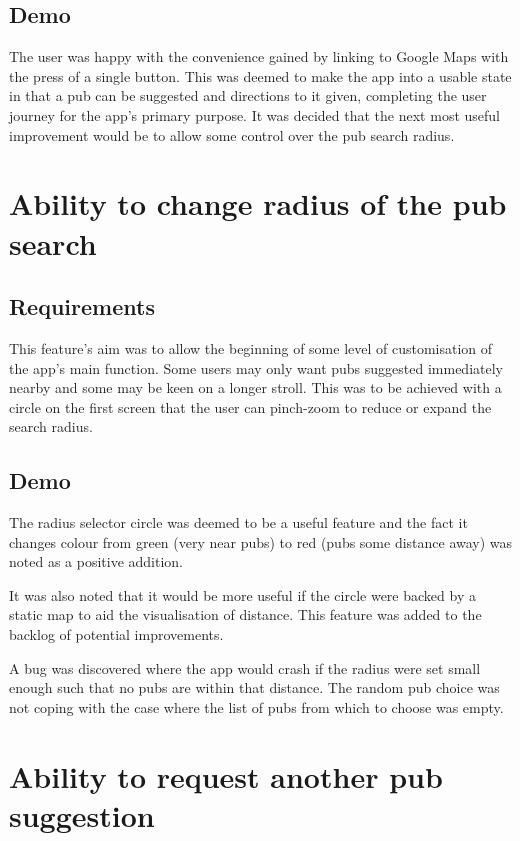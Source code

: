\documentclass{report}
\begin{document}
\subsection{Demo}

The user was happy with the convenience gained by linking to Google Maps
with the press of a single button. This was deemed to make the app into
a usable state in that a pub can be suggested and directions to it given,
completing the user journey for the app's primary purpose. It was decided
that the next most useful improvement would be to allow some control over
the pub search radius.

\section{Ability to change radius of the pub search}
\label{sec:change-radius}
\subsection{Requirements}

This feature's aim was to allow the beginning of some level of customisation
of the app's main function. Some users may only want pubs suggested
immediately nearby and some may be keen on a longer stroll. This was to be
achieved with a circle on the first screen that the user can pinch-zoom
to reduce or expand the search radius.

\subsection{Demo}

The radius selector circle was deemed to be a useful feature and the fact
it changes colour from green (very near pubs) to red (pubs some distance
away) was noted as a positive addition.

It was also noted that it would be more useful if the circle were backed
by a static map to aid the visualisation of distance. This feature was
added to the backlog of potential improvements.

A bug was discovered where the app would crash if the radius were set
small enough such that no pubs are within that distance. The random
pub choice was not coping with the case where the list of pubs
from which to choose was empty.

\section{Ability to request another pub suggestion}
\label{sec:another-pub}
\end{document}
